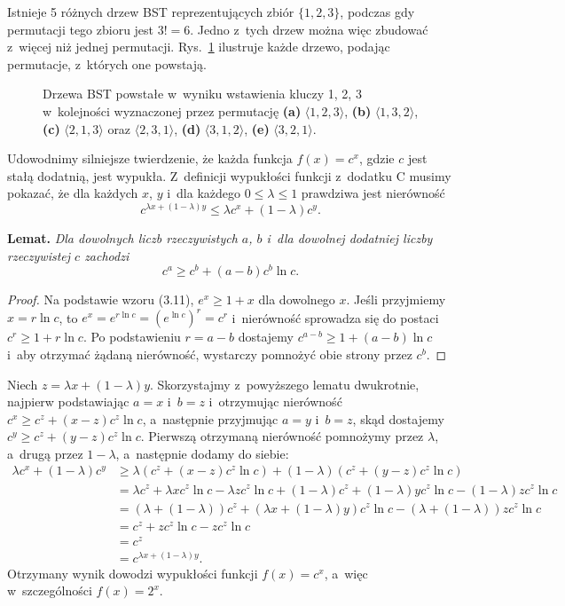 \exercise %
Istnieje 5 różnych drzew BST reprezentujących zbiór $\{1,2,3\}$, podczas gdy permutacji tego zbioru jest $3!=6$.
Jedno z~tych drzew można więc zbudować z~więcej niż jednej permutacji.
Rys.~\ref{fig:12.4-3} ilustruje każde drzewo, podając permutacje, z~których one powstają.
\begin{figure}[!ht]
	\centering 
	\caption{Drzewa BST powstałe w~wyniku wstawienia kluczy 1, 2, 3 w~kolejności wyznaczonej przez permutację {\sffamily\bfseries(a)} $\langle1,2,3\rangle$,
{\sffamily\bfseries(b)} $\langle1,3,2\rangle$,
{\sffamily\bfseries(c)} $\langle2,1,3\rangle$ oraz $\langle2,3,1\rangle$, {\sffamily\bfseries(d)} $\langle3,1,2\rangle$, {\sffamily\bfseries(e)} $\langle3,2,1\rangle$.} \label{fig:12.4-3}
\end{figure}

\exercise %
Udowodnimy silniejsze twierdzenie, że każda funkcja $f(x)=c^x$, gdzie $c$ jest stałą dodatnią, jest wypukła.
Z~definicji wypukłości funkcji z~dodatku C musimy pokazać, że dla każdych $x$, $y$ i~dla każdego $0\le\lambda\le1$ prawdziwa jest nierówność
\[
	c^{\lambda x+(1-\lambda)y} \le \lambda c^x+(1-\lambda)c^y.
\]

\medskip
\noindent\textsf{\textbf{Lemat.}} \textit{Dla dowolnych liczb rzeczywistych\/ $a$,\/ $b$ i~dla dowolnej dodatniej liczby rzeczywistej\/ $c$ zachodzi
\[
	c^a \ge c^b+(a-b)c^b\ln c.
\]
}
\begin{proof}
Na podstawie wzoru (3.11), $e^x\ge1+x$ dla dowolnego $x$.
Jeśli przyjmiemy $x=r\ln c$, to $e^x=e^{r\ln c}=(e^{\ln c})^r=c^r$ i~nierówność sprowadza się do postaci $c^r\ge1+r\ln c$.
Po podstawieniu $r=a-b$ dostajemy $c^{a-b}\ge1+(a-b)\ln c$ i~aby otrzymać żądaną nierówność, wystarczy pomnożyć obie strony przez $c^b$.
\end{proof}

Niech $z=\lambda x+(1-\lambda)y$.
Skorzystajmy z~powyższego lematu dwukrotnie, najpierw podstawiając $a=x$ i~$b=z$ i~otrzymując nierówność $c^x\ge c^z+(x-z)c^z\ln c$, a~następnie przyjmując $a=y$ i~$b=z$, skąd dostajemy $c^y\ge c^z+(y-z)c^z\ln c$.
Pierwszą otrzymaną nierówność pomnożymy przez $\lambda$, a~drugą przez $1-\lambda$, a~następnie dodamy do siebie:
\begin{align*}
	\lambda c^x+(1-\lambda)c^y &\ge \lambda(c^z+(x-z)c^z\ln c)+(1-\lambda)(c^z+(y-z)c^z\ln c) \\
	&= \lambda c^z+\lambda xc^z\ln c-\lambda zc^z\ln c+(1-\lambda)c^z+(1-\lambda)yc^z\ln c-(1-\lambda)zc^z\ln c \\
	&= (\lambda+(1-\lambda))c^z+(\lambda x+(1-\lambda)y)c^z\ln c-(\lambda+(1-\lambda))zc^z\ln c \\
	&= c^z+zc^z\ln c-zc^z\ln c \\
	&= c^z \\
	&= c^{\lambda x+(1-\lambda)y}.
\end{align*}
Otrzymany wynik dowodzi wypukłości funkcji $f(x)=c^x$, a~więc w~szczególności $f(x)=2^x$.


